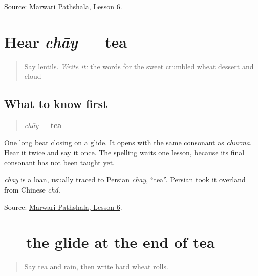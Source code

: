 \begin{tcolorbox}[breakable,colback=teal!4,colframe=teal!35!black,title={Before you move on}]
Source: \href{https://www.marwaripathshala.com/marwari-lesson-6-english}{Marwari Pathshala, Lesson 6}.
\end{tcolorbox}
\section[chāy]{Hear \emph{chāy} — tea}

\label{lesson:MW-C20-hear-chaay}



\begin{quote}
Say lentils. \emph{Write it:} the words for the sweet crumbled wheat dessert and cloud
\end{quote}

\subsection*{What to know first}
\begin{quote}
\emph{chāy} — \textbf{tea}
\end{quote}

One long beat closing on a glide. It opens with the same consonant as \emph{chūrmā}. Hear it twice and say it once. The spelling waits one lesson, because its final consonant has not been taught yet.

\begin{cousinweb}
\emph{chāy} is a loan, usually traced to Persian \emph{chāy}, \textquotedblleft{}tea\textquotedblright{}. Persian took it overland from Chinese \emph{chá}.
\end{cousinweb}

\begin{tcolorbox}[breakable,colback=teal!4,colframe=teal!35!black,title={Before you move on}]
Source: \href{https://www.marwaripathshala.com/marwari-lesson-6-english}{Marwari Pathshala, Lesson 6}.
\end{tcolorbox}
\section[\texorpdfstring{\mw{य} (ya)}{य (ya)}]{ — the glide at the end of tea}

\label{lesson:MW-W20-ya}



\begin{quote}
Say tea and rain, then write hard wheat rolls.
\end{quote}

